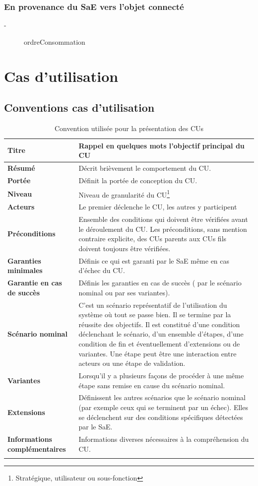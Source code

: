 \documentclass[10pt,a4paper]{report}
\renewcommand{\arraystretch}{1.2}
\begin{document}
			\subsection{En provenance du SaE vers l'objet connecté}
			
\begin{description}
	\item[-] ordreConsommation
\end{description}


	\chapter{Cas d'utilisation}
		\section{Conventions cas d'utilisation}

{
\renewcommand{\arraystretch}{1.2}
\begin{longtable}{| p{5cm} | p{11cm} |}
	\hline
	\cellcolor{lightgray}\textbf{\textbf{Titre}} & \cellcolor{lightgray}\textbf{Rappel en quelques mots l'objectif principal du CU}\tabularnewline
	\hline
	\textbf{Résumé} & Décrit brièvement le comportement du CU.\tabularnewline
	\hline
	\textbf{Portée} & Définit la portée de conception du CU.\tabularnewline
	\hline
	\textbf{Niveau} & Niveau de granularité du CU\footnote{Stratégique, utilisateur ou sous-fonction}\tabularnewline
	\hline
	\textbf{Acteurs} & Le premier déclenche le CU, les autres y participent\tabularnewline
	\hline
	\textbf{Préconditions } & Ensemble des conditions qui doivent être vérifiées avant le déroulement du CU. Les préconditions, sans mention contraire explicite, des CUs parents aux CUs fils doivent toujours être vérifiées.\tabularnewline
	\hline
	\textbf{Garanties minimales} & Définis ce qui est garanti par le SaE même en cas d'échec du CU.\tabularnewline
	\hline
	\textbf{Garantie en cas de succès} & Définis les garanties en cas de succès ( par le scénario nominal ou par ses variantes).\tabularnewline
	\hline
	\textbf{Scénario nominal} & C'est un scénario représentatif de l'utilisation du système où tout se passe bien. Il se termine par la réussite des objectifs. Il est constitué d'une condition déclenchant le scénario, d'un ensemble d'étapes, d'une condition de fin et éventuellement d'extensions ou de variantes. Une étape peut être une interaction entre acteurs ou une étape de validation.\tabularnewline
	\hline
	\textbf{Variantes} & Lorsqu'il y a plusieurs façons de procéder à une même étape sans remise en cause du scénario nominal.\tabularnewline
	\hline
	\textbf{Extensions} & Définissent les autres scénarios que le scénario nominal (par exemple ceux qui se terminent par un échec). Elles se déclenchent sur des conditions spécifiques détectées par le SaE.\tabularnewline
	\hline
	\textbf{Informations complémentaires} & Informations diverses nécessaires à la compréhension du CU.\tabularnewline
	\hline
\caption{Convention utilisée pour la présentation des CUs}	
\label{tableConventionCU}
\end{longtable}
}
\end{document}
